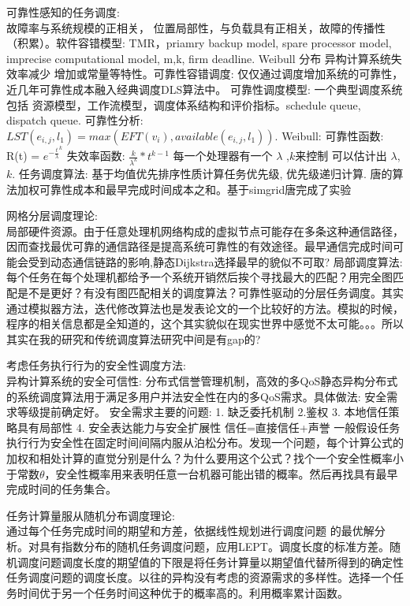 \documentclass[8pt,UTF8]{article}
\begin{document}
                可靠性感知的任务调度:\\ 故障率与系统规模的正相关， 位置局部性，与负载具有正相关，故障的传播性（积累）。软件容错模型: TMR，priamry backup model, spare processor model, imprecise computational model, m,k, firm deadline. Weibull 分布 异构计算系统失效率减少 增加或常量等特性。可靠性容错调度: 仅仅通过调度增加系统的可靠性，近几年可靠性成本融入经典调度DLS算法中。 可靠性调度模型: 一个典型调度系统包括 资源模型，工作流模型，调度体系结构和评价指标。schedule queue, dispatch queue. 可靠性分析: $LST(e_{i,j},l_1) = max(EFT(v_i), available(e_{i,j}, l_1))$. Weibull: 可靠性函数: R(t) = $e^{{-\frac{t}{\lambda}}^k}$ 失效率函数: $\frac{k}{\lambda^k}*t^{k - 1}$ 每一个处理器有一个 $\lambda$ ,$k$来控制 \cite{murthy2004weibull} 可以估计出 $\lambda$,$k$.  任务调度算法: 基于均值优先排序性质计算任务优先级, 优先级递归计算. 唐的算法加权可靠性成本和最早完成时间成本之和。基于simgrid唐完成了实验
                
                网格分层调度理论:\\局部硬件资源。由于任意处理机网络构成的虚拟节点可能存在多条这种通信路径，因而查找最优可靠的通信路径是提高系统可靠性的有效途径。最早通信完成时间可能会受到动态通信链路的影响,静态Dijkstra选择最早的貌似不可取?  局部调度算法: 每个任务在每个处理机都给予一个系统开销然后挨个寻找最大的匹配？用完全图匹配是不是更好？有没有图匹配相关的调度算法？可靠性驱动的分层任务调度。其实通过模拟器方法，迭代修改算法也是发表论文的一个比较好的方法。模拟的时候，程序的相关信息都是全知道的，这个其实貌似在现实世界中感觉不太可能。。。所以其实在我的研究和传统调度算法研究中间是有gap的?
                
                考虑任务执行行为的安全性调度方法:\\异构计算系统的安全可信性: 分布式信誉管理机制，高效的多QoS静态异构分布式的系统调度算法用于满足多用户并法安全性在内的多QoS需求。具体做法:  安全需求等级提前确定好。 安全需求主要的问题: 1. 缺乏委托机制 2.鉴权 3. 本地信任策略具有局部性 4. 安全表达能力与安全扩展性 信任=直接信任+声誉 一般假设任务执行行为安全性在固定时间间隔内服从泊松分布。发现一个问题，每个计算公式的加权和相处计算的直觉分别是什么？为什么要用这个公式？找个一个安全性概率小于常数$\theta$，安全性概率用来表明任意一台机器可能出错的概率。然后再找具有最早完成时间的任务集合。
                
                任务计算量服从随机分布调度理论:\\ 通过每个任务完成时间的期望和方差，依据线性规划进行调度问题 的最优解分析。对具有指数分布的随机任务调度问题，应用LEPT。调度长度的标准方差。随机调度问题调度长度的期望值的下限是将任务计算量以期望值代替所得到的确定性任务调度问题的调度长度。以往的异构没有考虑的资源需求的多样性。选择一个任务时间优于另一个任务时间这种优于的概率高的。利用概率累计函数。
                
\end{document}

